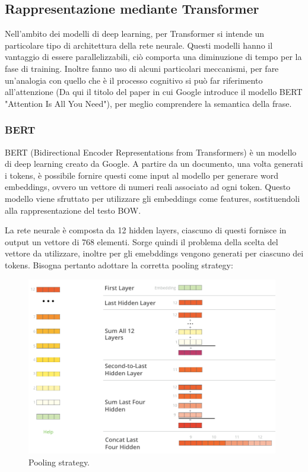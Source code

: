 \documentclass[oneside]{book}
\begin{document}
\subsection{Rappresentazione mediante Transformer}
Nell'ambito dei modelli di deep learning, per Transformer si intende un particolare tipo di architettura della rete neurale. Questi modelli hanno il vantaggio di essere parallelizzabili, ciò comporta una diminuzione di tempo per la fase di training. Inoltre fanno uso di alcuni particolari meccanismi, per fare un'analogia con quello che è il processo cognitivo si può far riferimento all'attenzione (Da qui il titolo del paper in cui Google introduce il modello BERT "Attention Is All You Need"\cite{bert}), per meglio comprendere la semantica della frase\cite{transformer}.

\subsubsection{BERT}
BERT (Bidirectional Encoder Representations from Transformers) è un modello di deep learning creato da Google. A partire da un documento, una volta generati i tokens, è possibile fornire questi come input al modello per generare word embeddings, ovvero un vettore di numeri reali associato ad ogni token. Questo modello viene sfruttato per utilizzare gli embeddings come features, sostituendoli alla rappresentazione del testo BOW.

La rete neurale è composta da 12 hidden layers, ciascuno di questi fornisce in output un vettore di 768 elementi. Sorge quindi il problema della scelta del vettore da utilizzare, inoltre per gli emebddings vengono generati per ciascuno dei tokens. Bisogna pertanto adottare la corretta pooling strategy:

\begin{figure}[!h]
	\centering
	\includegraphics[width=11cm]{assets/pooling-strategy.png}
	\caption[Caption for LOF]{Pooling strategy. \cite{transformer}}
\end{figure}
\end{document}
